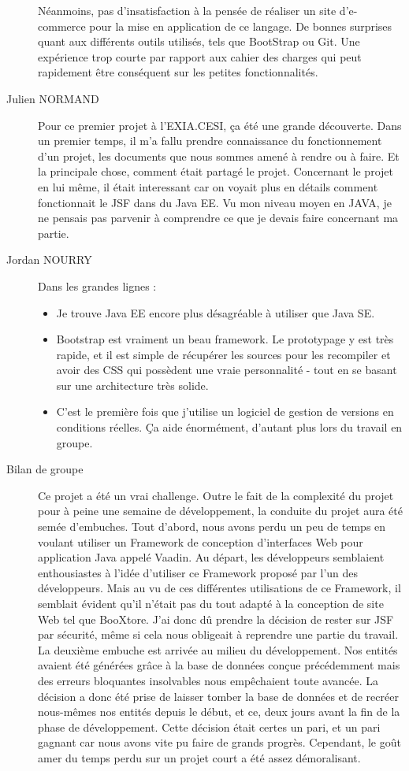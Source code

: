 \begin{description}
	Néanmoins, pas d'insatisfaction à la pensée de réaliser un site d'e-commerce pour la mise en application de ce langage. De bonnes surprises quant aux différents outils utilisés, tels que BootStrap ou Git. Une expérience trop courte par rapport aux cahier des charges qui peut rapidement être conséquent sur les petites fonctionnalités.
	\item[Julien NORMAND]
	Pour ce premier projet à l'EXIA.CESI, ça été une grande découverte. Dans un premier temps, il m'a fallu prendre connaissance du fonctionnement d'un projet, les documents que nous sommes amené à rendre ou à faire. Et la principale chose, comment était partagé le projet.
	Concernant le projet en lui même, il était interessant car on voyait plus en détails comment fonctionnait le JSF dans du Java EE. Vu mon niveau moyen en JAVA, je ne pensais pas parvenir à comprendre ce que je devais faire concernant ma partie.
	\item[Jordan NOURRY]
	Dans les grandes lignes :
		\begin{itemize}
			\item Je trouve Java EE encore plus désagréable à utiliser que Java SE.
			\item Bootstrap est vraiment un beau framework. Le prototypage y est très rapide, et il est simple de récupérer les sources pour les recompiler et avoir des CSS qui possèdent une vraie personnalité - tout en se basant sur une architecture très solide.
			\item C'est le première fois que j'utilise un logiciel de gestion de versions en conditions réelles. Ça aide énormément, d'autant plus lors du travail en groupe.
		\end{itemize}
	\item[Bilan de groupe]
	Ce projet a été un vrai challenge. Outre le fait de la complexité du projet pour à peine une semaine de développement, la conduite du projet aura été semée d’embuches. Tout d’abord, nous avons perdu un peu de temps en voulant utiliser un Framework de conception d’interfaces Web pour application Java appelé Vaadin. Au départ, les développeurs semblaient enthousiastes à l’idée d’utiliser ce Framework proposé par l’un des développeurs. Mais au vu de ces différentes utilisations de ce Framework, il semblait évident qu’il n’était pas du tout adapté à la conception de site Web tel que BooXtore. J’ai donc dû prendre la décision de rester sur JSF par sécurité, même si cela nous obligeait à reprendre une partie du travail. La deuxième embuche est arrivée au milieu du développement. Nos entités avaient été générées grâce à la base de données conçue précédemment mais des erreurs bloquantes insolvables nous empêchaient toute avancée. La décision a donc été prise de laisser tomber la base de données et de recréer nous-mêmes nos entités depuis le début, et ce, deux jours avant la fin de la phase de développement. Cette décision était certes un pari, et un pari gagnant car nous avons vite pu faire de grands progrès. Cependant, le goût amer du temps perdu sur un projet court a été assez démoralisant.

\end{description}
